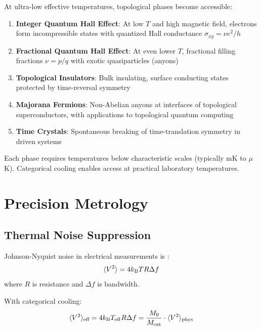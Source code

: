 At ultra-low effective temperatures, topological phases become accessible:

\begin{enumerate}
    \item \textbf{Integer Quantum Hall Effect}: At low $T$ and high magnetic field, electrons form incompressible states with quantized Hall conductance $\sigma_{xy} = \nu e^2/h$ \cite{klitzing1980}

    \item \textbf{Fractional Quantum Hall Effect}: At even lower $T$, fractional filling fractions $\nu = p/q$ with exotic quasiparticles (anyons) \cite{tsui1982,laughlin1983}

    \item \textbf{Topological Insulators}: Bulk insulating, surface conducting states protected by time-reversal symmetry \cite{kane2005,bernevig2006}

    \item \textbf{Majorana Fermions}: Non-Abelian anyons at interfaces of topological superconductors, with applications to topological quantum computing \cite{kitaev2001,nayak2008}

    \item \textbf{Time Crystals}: Spontaneous breaking of time-translation symmetry in driven systems \cite{wilczek2012,zhang2017}
\end{enumerate}

Each phase requires temperatures below characteristic scales (typically mK to $\mu$K). Categorical cooling enables access at practical laboratory temperatures.

\section{Precision Metrology}

\subsection{Thermal Noise Suppression}

Johnson-Nyquist noise in electrical measurements is \cite{johnson1928,nyquist1928}:
\begin{equation}
\langle V^2 \rangle = 4k_{\mathrm{B}} T R \Delta f
\label{eq:johnson_noise}
\end{equation}
where $R$ is resistance and $\Delta f$ is bandwidth.

With categorical cooling:
\begin{equation}
\langle V^2 \rangle_{\text{eff}} = 4k_{\mathrm{B}} T_{\mathrm{eff}} R \Delta f = \frac{M_0}{M_{\mathrm{cat}}} \cdot \langle V^2 \rangle_{\text{phys}}
\label{eq:cat_noise}
\end{equation}

